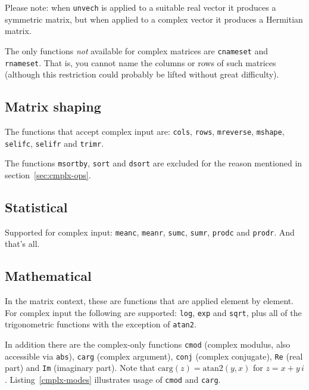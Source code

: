 Please note: when \texttt{unvech} is applied to a suitable real
vector it produces a symmetric matrix, but when applied to a complex
vector it produces a Hermitian matrix.

The only functions \textit{not} available for complex matrices are
\texttt{cnameset} and \texttt{rnameset}. That is, you cannot name the
columns or rows of such matrices (although this restriction could
probably be lifted without great difficulty).

\subsection{Matrix shaping}

The functions that accept complex input are: \texttt{cols},
\texttt{rows}, \texttt{mreverse}, \texttt{mshape}, \texttt{selifc},
\texttt{selifr} and \texttt{trimr}.

The functions \texttt{msortby}, \texttt{sort} and \texttt{dsort} are
excluded for the reason mentioned in section~\ref{sec:cmplx-ops}.

\subsection{Statistical}

Supported for complex input: \texttt{meanc}, \texttt{meanr},
\texttt{sumc}, \texttt{sumr}, \texttt{prodc} and \texttt{prodr}. And
that's all.

\subsection{Mathematical}

In the matrix context, these are functions that are applied element by
element. For complex input the following are supported: \texttt{log},
\texttt{exp} and \texttt{sqrt}, plus all of the trigonometric
functions with the exception of \texttt{atan2}.

In addition there are the complex-only functions \texttt{cmod}
(complex modulus, also accessible via \texttt{abs}), \texttt{carg}
(complex argument), \texttt{conj} (complex conjugate), \texttt{Re}
(real part) and \texttt{Im} (imaginary part). Note that
$\mbox{carg}(z) = \mbox{atan2}(y,x)$ for $z=x +
y\,i$. Listing~\ref{cmplx-modes} illustrates usage of \texttt{cmod}
and \texttt{carg}.


